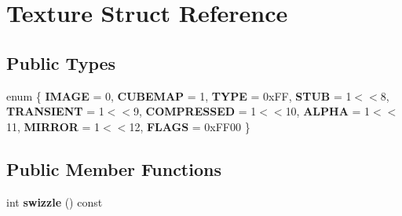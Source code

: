 \hypertarget{struct_texture}{}\section{Texture Struct Reference}
\label{struct_texture}
\subsection*{Public Types}
\begin{DoxyCompactItemize}
\item 
\mbox{\label{struct_texture_acd8e56ed0f417bd336630dcb17e3d841}} 
enum \{ \newline
{\bfseries I\+M\+A\+GE} = 0, 
{\bfseries C\+U\+B\+E\+M\+AP} = 1, 
{\bfseries T\+Y\+PE} = 0x\+FF, 
{\bfseries S\+T\+UB} = 1$<$$<$8, 
\newline
{\bfseries T\+R\+A\+N\+S\+I\+E\+NT} = 1$<$$<$9, 
{\bfseries C\+O\+M\+P\+R\+E\+S\+S\+ED} = 1$<$$<$10, 
{\bfseries A\+L\+P\+HA} = 1$<$$<$11, 
{\bfseries M\+I\+R\+R\+OR} = 1$<$$<$12, 
\newline
{\bfseries F\+L\+A\+GS} = 0x\+F\+F00
 \}
\end{DoxyCompactItemize}
\subsection*{Public Member Functions}
\begin{DoxyCompactItemize}
\item 
\mbox{\label{struct_texture_a4ca93f5851c41e69d20445947e83952a}} 
int {\bfseries swizzle} () const
\end{DoxyCompactItemize}
